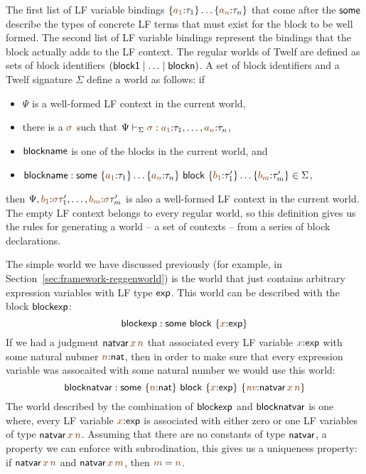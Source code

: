 The first list of LF variable bindings
$\{\lf{a_1}{:}\tau_1\}\ldots\{\lf{a_n}{:}\tau_n\}$ that 
come after the ${\sf some}$ describe the types
of concrete LF terms that must exist for the block to be well formed.
The second list of LF variable bindings represent the bindings that
the block actually adds to the LF context. The regular worlds of 
Twelf are defined as sets of block identifiers 
$({\sf block1} \mid \ldots \mid {\sf blockn})$. A set of block identifiers
and a Twelf signature $\Sigma$ define a world as follows: if
\smallskip
\begin{itemize}
\item $\Psi$ is a well-formed
LF context in the current world, 
\item there is a $\lf{\sigma}$ such that
$\Psi \vdash_\Sigma \lf{\sigma} :
\lf{a_1}{:}\tau_1,\ldots,\lf{a_n}{:}\tau_n$, 
\item ${\sf blockname}$ is one of the blocks in the current world, and
\item ${\sf blockname} :
 {\sf some}~\{\lf{a_1}{:}\tau_1\}\ldots\{\lf{a_n}{:}\tau_n\}
~{\sf block}~\{\lf{b_1}{:}\tau'_1\}\ldots\{\lf{b_m}{:}\tau'_m\} \in \Sigma$,
\end{itemize}
\smallskip
then $\Psi,
\lf{b_1}{:}\lf\sigma\tau'_1,\ldots, \lf{b_m}{:}\lf\sigma\tau'_m$ is
also a well-formed LF context in the current world. The empty LF context
belongs to every regular world, so this definition gives us the rules for 
generating a world -- a set of contexts -- from a series of block 
declarations. 

The simple world we have discussed previously (for
example, in Section~\ref{sec:framework-reggenworld}) is the
world that just contains arbitrary expression variables with LF type
${\sf exp}$. This world can be described with the block ${\sf blockexp}$:
\[
 {\sf blockexp} : 
 {\sf some}
~{\sf block}~\{{\lf x}{:}{\sf exp}\}
\]
If we had a judgment ${\sf natvar}\,\lf{x}\,\lf{n}$ that associated
every LF variable $\lf{x}{:}{\sf exp}$ with some natural nubmer
$\lf{n}{:}{\sf nat}$, then in order to make sure that every expression
variable was assocaited with some natural number we would use this
world:
\[
 {\sf blocknatvar} : 
 {\sf some}~\{{\lf n}{:}{\sf nat}\}
~{\sf block}~\{{\lf x}{:}{\sf exp}\}~
               \{\lf{\it nv}{:}{\sf natvar}\,\lf{x}\,\lf{n}\}
\]
The world described by the combination of ${\sf blockexp}$ and ${\sf
  blocknatvar}$ is one where, every LF variable $\lf{x}{:}{\sf exp}$
is associated with either zero or one LF variables of type ${\sf
  natvar}\,\lf{x}\,\lf{n}$. Assuming that there are no constants of
type ${\sf natvar}$, a property we can enforce with subrodination, this
gives us a uniqueness property: if ${\sf natvar}\,\lf{x}\,\lf{n}$ and
${\sf natvar}\,\lf{x}\,\lf{m}$, then $\lf{m} = \lf{n}$. 

